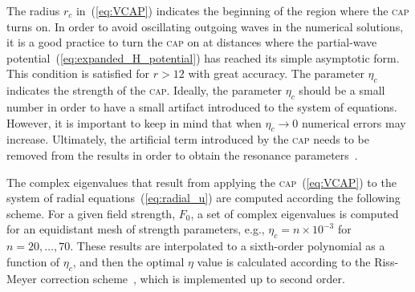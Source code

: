 The radius $r_{c}$ in~(\ref{eq:VCAP}) indicates the beginning of the
region where the \textsc{cap} turns on. In order to avoid oscillating
outgoing waves in the numerical solutions, it is a good practice to
turn the \textsc{cap} on at distances where the partial-wave
potential~(\ref{eq:expanded_H_potential}) has reached its simple
asymptotic form. This condition is satisfied for $r > 12$ with great
accuracy. The parameter $\eta_{c}$ indicates the strength of the
\textsc{cap}. Ideally, the parameter $\eta_{c}$ should be a small
number in order to have a small artifact introduced to the system of
equations. However, it is important to keep in mind that when
$\eta_{c}\to 0$ numerical errors may increase. Ultimately, the
artificial term introduced by the \textsc{cap} needs to be removed
from the results in order to obtain the resonance
parameters~\cite{RissMeyer_1993}.

The complex eigenvalues that result from applying the
\textsc{cap}~(\ref{eq:VCAP}) to the system of radial
equations~(\ref{eq:radial_u}) are computed according the following
scheme. For a given field strength, $F_{0}$, a set of complex
eigenvalues is computed for an equidistant mesh of strength
parameters, e.g., $\eta_{c} = n \times 10^{-3}$ for $n = 20, \dots,
70$. These results are interpolated to a sixth-order polynomial as a
function of $\eta_{c}$, and then the optimal $\eta$ value is
calculated according to the Riss-Meyer correction
scheme~\cite{RissMeyer_1993}, which is implemented up to second order.

